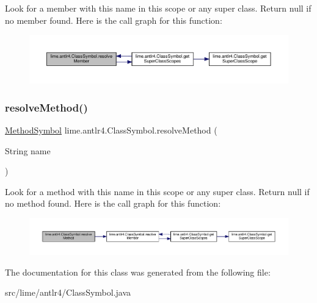 Look for a member with this name in this scope or any super class. Return null if no member found. Here is the call graph for this function\+:
\nopagebreak
\begin{figure}[H]
\begin{center}
\leavevmode
\includegraphics[width=350pt]{classlime_1_1antlr4_1_1ClassSymbol_a6bf9bcc8721faa0f5c61b9134e8ddf37_cgraph}
\end{center}
\end{figure}
\mbox{\label{classlime_1_1antlr4_1_1ClassSymbol_a8b22f82d150b8c2fce1330ce7e570bb9}} 
\subsubsection{\texorpdfstring{resolve\+Method()}{resolveMethod()}}
{\footnotesize\ttfamily \hyperlink{classlime_1_1antlr4_1_1MethodSymbol}{Method\+Symbol} lime.\+antlr4.\+Class\+Symbol.\+resolve\+Method (\begin{DoxyParamCaption}\item[{String}]{name }\end{DoxyParamCaption})}

Look for a method with this name in this scope or any super class. Return null if no method found. Here is the call graph for this function\+:
\nopagebreak
\begin{figure}[H]
\begin{center}
\leavevmode
\includegraphics[width=350pt]{classlime_1_1antlr4_1_1ClassSymbol_a8b22f82d150b8c2fce1330ce7e570bb9_cgraph}
\end{center}
\end{figure}


The documentation for this class was generated from the following file\+:\begin{DoxyCompactItemize}
\item 
src/lime/antlr4/Class\+Symbol.\+java\end{DoxyCompactItemize}
